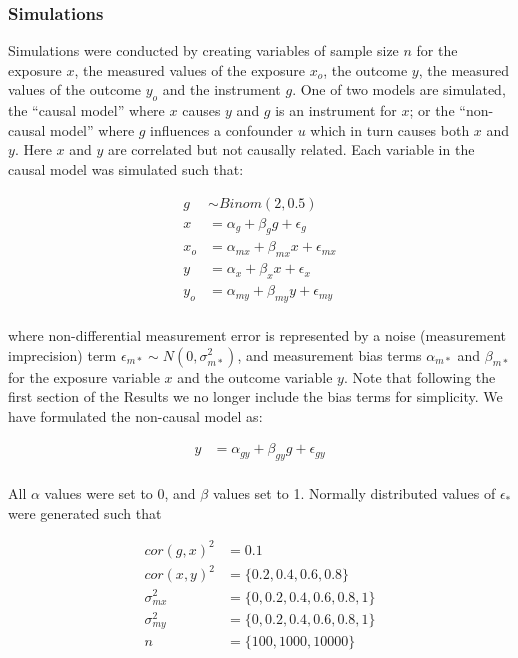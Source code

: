 \documentclass[]{article}
\begin{document}
\subsubsection{Simulations}\label{simulations}

Simulations were conducted by creating variables of sample size \(n\)
for the exposure \(x\), the measured values of the exposure \(x_o\), the
outcome \(y\), the measured values of the outcome \(y_o\) and the
instrument \(g\). One of two models are simulated, the ``causal model''
where \(x\) causes \(y\) and \(g\) is an instrument for \(x\); or the
``non-causal model'' where \(g\) influences a confounder \(u\) which in
turn causes both \(x\) and \(y\). Here \(x\) and \(y\) are correlated
but not causally related. Each variable in the causal model was
simulated such that:

\[
\begin{aligned}
g & \sim Binom(2, 0.5) \\
x & = \alpha_g + \beta_g g + \epsilon_g \\
x_o & = \alpha_{mx} + \beta_{mx} x + \epsilon_{mx} \\
y & = \alpha_x + \beta_x x + \epsilon_x \\
y_o & = \alpha_{my} + \beta_{my} y + \epsilon_{my} \\
\end{aligned}
\]

where non-differential measurement error is represented by a noise
(measurement imprecision) term
\(\epsilon_{m*} \sim N(0, \sigma^2_{m*})\), and measurement bias terms
\(\alpha_{m*}\) and \(\beta_{m*}\) for the exposure variable \(x\) and
the outcome variable \(y\). Note that following the first section of the
Results we no longer include the bias terms for simplicity. We have
formulated the non-causal model as:

\[
\begin{aligned}
y & = \alpha_{gy} + \beta_{gy} g + \epsilon_{gy} \\
\end{aligned}
\]

All \(\alpha\) values were set to 0, and \(\beta\) values set to 1.
Normally distributed values of \(\epsilon_*\) were generated such that

\[
\begin{aligned}
cor(g, x)^2 & = 0.1 \\
cor(x, y)^2 & = \{0.2, 0.4, 0.6, 0.8\} \\
\sigma^2_{mx} & = \{0, 0.2, 0.4, 0.6, 0.8, 1\} \\
\sigma^2_{my} & = \{0, 0.2, 0.4, 0.6, 0.8, 1\} \\
n & = \{100, 1000, 10000\}
\end{aligned}
\]
\end{document}
